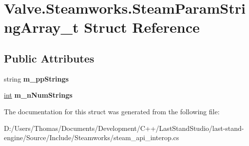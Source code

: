 \hypertarget{structValve_1_1Steamworks_1_1SteamParamStringArray__t}{}\section{Valve.\+Steamworks.\+Steam\+Param\+String\+Array\+\_\+t Struct Reference}
\label{structValve_1_1Steamworks_1_1SteamParamStringArray__t}
\subsection*{Public Attributes}
\begin{DoxyCompactItemize}
\item 
\hypertarget{structValve_1_1Steamworks_1_1SteamParamStringArray__t_a96b83b5330a2a4e18a0909212557c5a3}{}string {\bfseries m\+\_\+pp\+Strings}\label{structValve_1_1Steamworks_1_1SteamParamStringArray__t_a96b83b5330a2a4e18a0909212557c5a3}

\item 
\hypertarget{structValve_1_1Steamworks_1_1SteamParamStringArray__t_a13dd1efaadf7361bd7da480035f1d923}{}\hyperlink{SDL__thread_8h_a6a64f9be4433e4de6e2f2f548cf3c08e}{int} {\bfseries m\+\_\+n\+Num\+Strings}\label{structValve_1_1Steamworks_1_1SteamParamStringArray__t_a13dd1efaadf7361bd7da480035f1d923}

\end{DoxyCompactItemize}


The documentation for this struct was generated from the following file\+:\begin{DoxyCompactItemize}
\item 
D\+:/\+Users/\+Thomas/\+Documents/\+Development/\+C++/\+Last\+Stand\+Studio/last-\/stand-\/engine/\+Source/\+Include/\+Steamworks/steam\+\_\+api\+\_\+interop.\+cs\end{DoxyCompactItemize}
